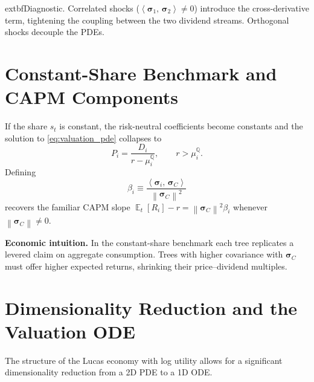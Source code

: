 ﻿\documentclass[11pt,letterpaper,oneside]{article}
\numberwithin{equation}{section}
\DeclareMathOperator{\E}{\mathbb{E}}
\newcommand{\1}{\mathbf{1}}
\newcommand{\norm}[1]{\left\lVert #1\right\rVert}
\newcommand{\ip}[2]{\left\langle #1,\,#2\right\rangle}
\begin{document}
\begin{tcolorbox}[mathstyle]
  	extbf{Diagnostic.} Correlated shocks ($\ip{\bm{\sigma}_1}{\bm{\sigma}_2}\neq0$) introduce the cross-derivative term, tightening the coupling between the two dividend streams. Orthogonal shocks decouple the PDEs.
\end{tcolorbox}

\section{Constant-Share Benchmark and CAPM Components}\label{sec:benchmark}
If the share $s_t$ is constant, the risk-neutral coefficients become constants and the solution to \eqref{eq:valuation_pde} collapses to
\begin{equation}\label{eq:const_share_solution}
  P_i = \frac{D_i}{r-\mu_i^{\mathbb{Q}}}, \qquad r>\mu_i^{\mathbb{Q}}.
\end{equation}
Defining
\begin{equation}\label{eq:beta}
  \beta_i \equiv \frac{\ip{\bm{\sigma}_i}{\bm{\sigma}_C}}{\norm{\bm{\sigma}_C}^2}
\end{equation}
recovers the familiar CAPM slope $\E_t[R_i]-r=\norm{\bm{\sigma}_C}^2\beta_i$ whenever $\norm{\bm{\sigma}_C}\neq0$.

\begin{tcolorbox}[didacticstyle]
\textbf{Economic intuition.} In the constant-share benchmark each tree replicates a levered claim on aggregate consumption. Trees with higher covariance with $\bm{\sigma}_C$ must offer higher expected returns, shrinking their price--dividend multiples.
\end{tcolorbox}

\section{Dimensionality Reduction and the Valuation ODE}\label{sec:reduction}

The structure of the Lucas economy with log utility allows for a significant dimensionality reduction from a 2D PDE to a 1D ODE.
\end{document}
